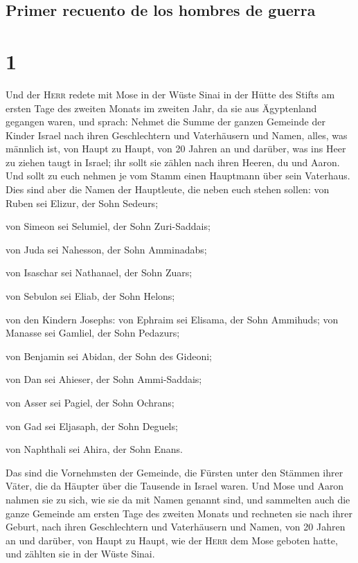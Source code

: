 \hypertarget{primer-recuento-de-los-hombres-de-guerra}{%
\subsection{Primer recuento de los hombres de
guerra}\label{primer-recuento-de-los-hombres-de-guerra}}

\hypertarget{section}{%
\section{1}\label{section}}

 Und der \textsc{Herr} redete mit Mose in der Wüste Sinai
in der Hütte des Stifts am ersten Tage des zweiten Monats im zweiten
Jahr, da sie aus Ägyptenland gegangen waren, und sprach: 
Nehmet die Summe der ganzen Gemeinde der Kinder Israel nach ihren
Geschlechtern und Vaterhäusern und Namen, alles, was männlich ist, von
Haupt zu Haupt,  von 20 Jahren an und darüber, was ins
Heer zu ziehen taugt in Israel; ihr sollt sie zählen nach ihren Heeren,
du und Aaron.  Und sollt zu euch nehmen je vom Stamm einen
Hauptmann über sein Vaterhaus.  Dies sind aber die Namen
der Hauptleute, die neben euch stehen sollen: von Ruben sei Elizur, der
Sohn Sedeurs;

 von Simeon sei Selumiel, der Sohn Zuri-Saddais;

 von Juda sei Nahesson, der Sohn Amminadabs;

 von Isaschar sei Nathanael, der Sohn Zuars;

 von Sebulon sei Eliab, der Sohn Helons;

 von den Kindern Josephs: von Ephraim sei Elisama, der
Sohn Ammihuds; von Manasse sei Gamliel, der Sohn Pedazurs;

 von Benjamin sei Abidan, der Sohn des Gideoni;

 von Dan sei Ahieser, der Sohn Ammi-Saddais;

 von Asser sei Pagiel, der Sohn Ochrans;

 von Gad sei Eljasaph, der Sohn Deguels;

 von Naphthali sei Ahira, der Sohn Enans.

 Das sind die Vornehmsten der Gemeinde, die Fürsten unter
den Stämmen ihrer Väter, die da Häupter über die Tausende in Israel
waren.  Und Mose und Aaron nahmen sie zu sich, wie sie da
mit Namen genannt sind,  und sammelten auch die ganze
Gemeinde am ersten Tage des zweiten Monats und rechneten sie nach ihrer
Geburt, nach ihren Geschlechtern und Vaterhäusern und Namen, von 20
Jahren an und darüber, von Haupt zu Haupt,  wie der
\textsc{Herr} dem Mose geboten hatte, und zählten sie in der Wüste
Sinai.

